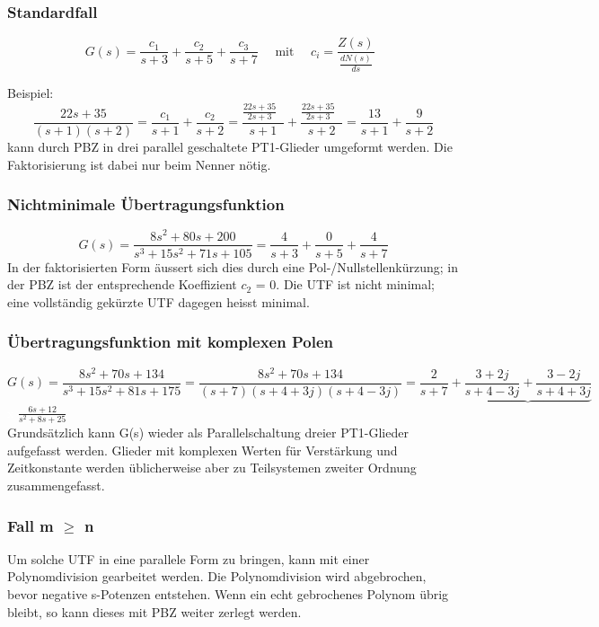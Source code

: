 \subsubsection{Standardfall}

\[ G(s) =\frac{c_{1}}{s+3} + \frac{c_{2}}{s+5} + \frac{c_{3}}{s+7} \quad \text{ mit } \quad {c_{i}= \frac{Z(s)}{\frac{dN(s)}{ds}}\mathop{\Bigg|_{s=p_{i}}}}\]

Beispiel: \[\frac{22s +35}{(s+1)(s+2)}=\frac{c_{1}}{s+1}+\frac{c_{2}}{s+2}=\frac{\frac{22s+35}{2s+3}\mathop{\Big|_{s=-1}}}{s+1}+\frac{\frac{22s+35}{2s+3}\mathop{\Big|_{s=-2}}}{s+2}=\frac{13}{s+1}+\frac{9}{s+2}\]
kann durch PBZ in drei parallel geschaltete PT1-Glieder umgeformt werden. Die
Faktorisierung ist dabei nur beim Nenner nötig.

\subsubsection{Nichtminimale Übertragungsfunktion}
\[G(s) =\frac{8s^{2} + 80s + 200}{s^3 + 15s^2 + 71s + 105}= \frac{4}{s+3} + \frac{0}{s+5} + \frac{4}{s+7}\]
In der faktorisierten Form äussert sich dies durch eine Pol-/Nullstellenkürzung; in der PBZ ist der entsprechende Koeffizient $c_{2}$ = 0. Die UTF ist nicht minimal; eine vollständig gekürzte UTF dagegen heisst minimal. \\

\subsubsection{Übertragungsfunktion mit komplexen Polen}
\[G(s) =\frac{8s^{2} + 70s + 134}{s^3 + 15s^2 + 81s + 175}= \frac{8s^2+70s+134}{(s+7)(s+4+3j)(s+4-3j)}=\frac{2}{s+7}+\underbrace{\frac{3+2j}{s+4-3j}+\frac{3-2j}{s+4+3j}}\]
\textcolor{white}{x} \hspace{14.5cm} $\frac{6s+12}{s^2+8s+25}$\\

Grundsätzlich kann G(s) wieder als Parallelschaltung dreier PT1-Glieder aufgefasst
werden. Glieder mit komplexen Werten für Verstärkung und Zeitkonstante werden
üblicherweise aber zu Teilsystemen zweiter Ordnung zusammengefasst.

\subsubsection{Fall m $\geq$ n}
Um solche UTF in eine
parallele Form zu bringen, kann mit einer Polynomdivision gearbeitet werden. Die Polynomdivision wird abgebrochen, bevor negative s-Potenzen entstehen. 
Wenn ein echt gebrochenes Polynom übrig bleibt, so kann dieses mit PBZ weiter zerlegt werden.




